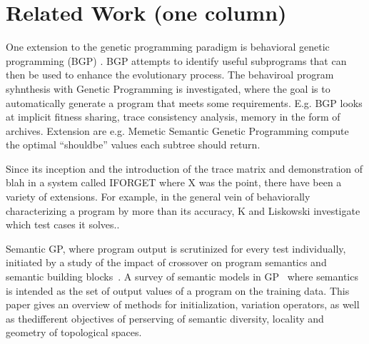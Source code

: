 \section{Related Work (one column)}
\label{sec:related-work}


One extension to the genetic programming paradigm is behavioral
genetic programming (BGP) \cite{krawiecGECCO2014,KrawiecBPS2016}.  BGP attempts to identify
useful subprograms that can then be used to enhance the evolutionary
process. The behaviroal program syhnthesis with Genetic
Programming\cite{krawiec2016behavioral} is investigated, where the
goal is to automatically generate a program that meets some
requirements. E.g. BGP looks at implicit fitness
sharing\cite{mckay2000fitness}, trace consistency analysis, memory in
the form of archives\cite{haynes1997line}. Extension are e.g. Memetic Semantic Genetic
Programming\cite{Ffrancon:2015:MSG:2739480.2754697} compute the
optimal ``shouldbe'' values each subtree should return.


  Since its inception\cite{KrawiecSwan} and the introduction of the trace matrix and demonstration of blah in a system called IFORGET where X was the point, there have been a variety of extensions. For example,  in the general vein of behaviorally characterizing a program by more than its accuracy, K and Liskowski investigate which test cases it solves..


Semantic GP, where program output is scrutinized for every test
individually, initiated by a study of the impact of crossover on
program semantics and semantic building
blocks~\cite{mcphee2008semantic}. A survey of semantic models in
GP~\cite{vanneschi2014survey} where semantics is intended as the set
of output values of a program on the training data. This paper gives
an overview of methods for initialization, variation operators, as
well as thedifferent objectives of perserving of semantic diversity,
locality and geometry of topological spaces.


